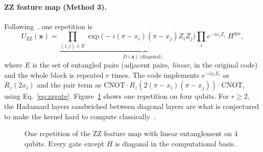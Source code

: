\paragraph{ZZ feature map (Method 3).} Following~\cite{havlicek2019}, one repetition is
\begin{equation}
U_{\text{ZZ}}(\bm x)=\underbrace{\prod_{(i,j)\in E}\exp\!\big(-i(\pi-x_i)(\pi-x_j)Z_iZ_j\big)\prod_i e^{-ix_iZ_i}}_{D(\bm x)\ \text{(diagonal)}}\;H^{\otimes n},
\label{eq:zzmap}
\end{equation}
where $E$ is the set of entangled pairs (adjacent pairs, \emph{linear}, in the original code) and
the whole block is repeated $r$ times. The code implements $e^{-ix_iZ_i}$ as $R_z(2x_i)$ and the
pair term as $\mathrm{CNOT}\cdot R_z(2(\pi-x_i)(\pi-x_j))\cdot\mathrm{CNOT}$, using
Eq.~\eqref{eq:zzgate}. Figure~\ref{fig:circuit} shows one repetition on four qubits. For $r\ge2$,
the Hadamard layers sandwiched between diagonal layers are what is conjectured to make the kernel
hard to compute classically~\cite{havlicek2019}.

\begin{figure}[H]
\centering
{}
\caption{One repetition of the ZZ feature map with linear entanglement on 4 qubits. Every gate
except $H$ is diagonal in the computational basis.}
\label{fig:circuit}
\end{figure}

